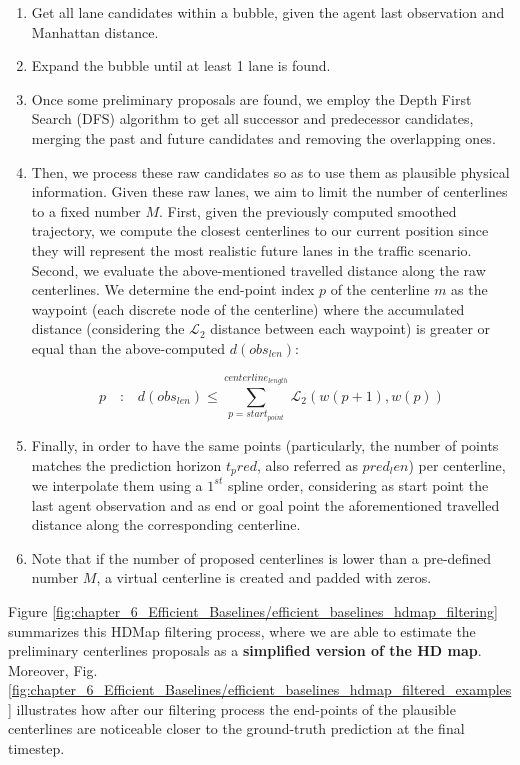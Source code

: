 \begin{enumerate}
	\item Get all lane candidates within a bubble, given the agent last observation and Manhattan distance.
	
	\item Expand the bubble until at least 1 lane is found.
	
	\item Once some preliminary proposals are found, we employ the Depth First Search (DFS) algorithm to get all successor and predecessor candidates, merging the past and future candidates and removing the overlapping ones.
	
	\item Then, we process these raw candidates so as to use them as plausible physical information. Given these raw lanes, we aim to limit the number of centerlines to a fixed number $M$. First, given the previously computed smoothed trajectory, we compute the closest centerlines to our current position since they will represent the most realistic future lanes in the traffic scenario. Second, we evaluate the above-mentioned travelled distance along the raw centerlines. We determine the end-point index $p$ of the centerline $m$ as the waypoint (each discrete node of the centerline) where the accumulated distance (considering the $\mathcal{L}_2$ distance between each waypoint) is greater or equal than the above-computed $d(obs_{len})$:
	
	\begin{equation}
		p \quad \textbf{:} \quad d(obs_{len}) \leq \sum_{p=start_{point}}^{centerline_{length}} \mathcal{L}_2(w(p+1),w(p))
	\end{equation}
	
	\item Finally, in order to have the same points (particularly, the number of points matches the prediction horizon $t_pred$, also referred as $pred_len$) per centerline, we interpolate them using a $1^{st}$ spline order, considering as start point the last agent observation and as end or goal point the aforementioned travelled distance along the corresponding centerline.
	
	\item Note that if the number of proposed centerlines is lower than a pre-defined number $M$, a virtual centerline is created and padded with zeros.
\end{enumerate}

Figure \ref{fig:chapter_6_Efficient_Baselines/efficient_baselines_hdmap_filtering} summarizes this HDMap filtering process, where we are able to estimate the preliminary centerlines proposals as a \textbf{simplified version of the HD map}. Moreover, Fig. \ref{fig:chapter_6_Efficient_Baselines/efficient_baselines_hdmap_filtered_examples} illustrates how after our filtering process the end-points of the plausible centerlines are noticeable closer to the ground-truth prediction at the final timestep. 

